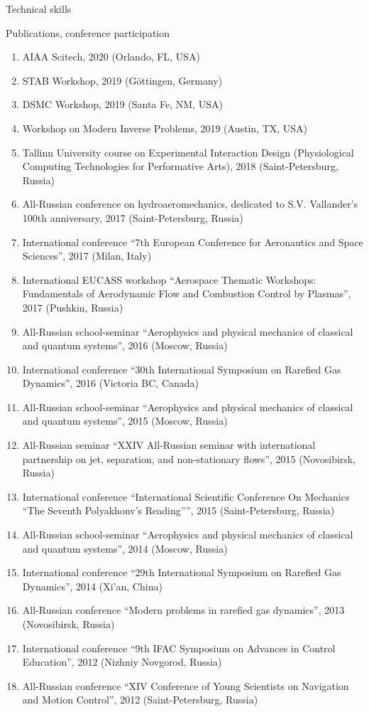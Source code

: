 \documentclass{resume} %
\begin{document}
\begin{rSection}{Technical skills}
\begin{rSection}{Publications, conference participation}
\begin{enumerate}
    \item AIAA Scitech, 2020 (Orlando, FL, USA)
    \item STAB Workshop, 2019 (Göttingen, Germany)
    \item DSMC Workshop, 2019 (Santa Fe, NM, USA)
    \item Workshop on Modern Inverse Problems, 2019 (Austin, TX, USA)
    \item Tallinn University course on Experimental Interaction Design (Physiological Computing Technologies for Performative Arts), 2018 (Saint-Petersburg, Russia)
    \item All-Russian conference on hydroaeromechanics, dedicated to S.V. Vallander's 100th anniversary, 2017 (Saint-Petersburg, Russia)
    \item International conference ``7th European Conference for Aeronautics and Space Sciences'', 2017 (Milan, Italy)
    \item International EUCASS workshop ``Aerospace Thematic Workshops: Fundamentals of Aerodynamic Flow and Combustion Control by Plasmas'', 2017 (Pushkin, Russia)
    \item All-Russian school-seminar ``Aerophysics and physical mechanics of classical and quantum systems'', 2016 (Moscow, Russia)
    \item International conference ``30th International Symposium on Rarefied Gas Dynamics'', 2016 (Victoria BC, Canada)
    \item All-Russian school-seminar ``Aerophysics and physical mechanics of classical and quantum systems'', 2015 (Moscow, Russia)
    \item All-Russian seminar ``XXIV All-Russian seminar with international partnership on jet, separation, and non-stationary flows'', 2015 (Novosibirsk, Russia)
    \item International conference ``International Scientific Conference On Mechanics ``The Seventh Polyakhonv's Reading'''', 2015 (Saint-Petersburg, Russia)
    \item All-Russian school-seminar ``Aerophysics and physical mechanics of classical and quantum systems'', 2014 (Moscow, Russia)
    \item International conference ``29th International Symposium on Rarefied Gas Dynamics'', 2014 (Xi'an, China)
    \item All-Russian conference ``Modern problems in rarefied gas dynamics'', 2013 (Novosibirsk, Russia)
    \item International conference ``9th IFAC Symposium on Advances in Control Education'', 2012 (Nizhniy Novgorod, Russia)
    \item All-Russian conference ``XIV Conference of Young Scientists on Navigation and Motion Control'', 2012 (Saint-Petersburg, Russia)
\end{enumerate}



\end{rSection}
\end{rSection}
\end{document}
